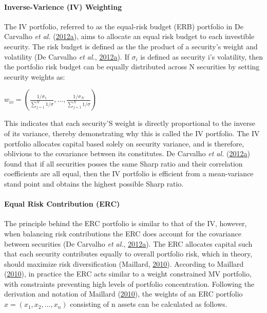 \documentclass[11pt,preprint, authoryear]{elsarticle}
\numberwithin{equation}{section}
\numberwithin{figure}{section}
\numberwithin{table}{section}
\begin{document}
\hypertarget{inverse-varience-iv-weighting}{%
\paragraph{Inverse-Varience (IV)
Weighting}\label{inverse-varience-iv-weighting}}

The IV portfolio, referred to as the equal-risk budget (ERB) portfolio
in De Carvalho \emph{et al.}
(\protect\hyperlink{ref-leote}{2012}\protect\hyperlink{ref-leote}{a}),
aims to allocate an equal risk budget to each investible security. The
risk budget is defined as the the product of a security's weight and
volatility (De Carvalho \emph{et al.},
\protect\hyperlink{ref-leote}{2012}\protect\hyperlink{ref-leote}{a}). If
\(\sigma_i\) is defined as security i's volatility, then the portfolio
risk budget can be equally distributed across N securities by setting
security weights as:

\begin{center} 
$w_{iv}=(\frac{1/\sigma_1}{\sum^N_{j=1} 1/\sigma}, ...,\frac{1/\sigma_N}{\sum^N_{j=1} 1/\sigma} )$ 
\end{center}

This indicates that each security'S weight is directly proportional to
the inverse of its variance, thereby demonstrating why this is called
the IV portfolio. The IV portfolio allocates capital based solely on
security variance, and is therefore, oblivious to the covariance between
its constitutes. De Carvalho \emph{et al.}
(\protect\hyperlink{ref-leote}{2012}\protect\hyperlink{ref-leote}{a})
found that if all securities posses the same Sharp ratio and their
correlation coefficients are all equal, then the IV portfolio is
efficient from a mean-variance stand point and obtains the highest
possible Sharp ratio.

\hypertarget{equal-risk-contribution-erc}{%
\paragraph{Equal Risk Contribution
(ERC)}\label{equal-risk-contribution-erc}}

The principle behind the ERC portfolio is similar to that of the IV,
however, when balancing risk contributions the ERC does account for the
covariance between securities (De Carvalho \emph{et al.},
\protect\hyperlink{ref-leote}{2012}\protect\hyperlink{ref-leote}{a}).
The ERC allocates capital such that each security contributes equally to
overall portfolio risk, which in theory, should maximize risk
diversification (Maillard, \protect\hyperlink{ref-maillard2010}{2010}).
According to Maillard (\protect\hyperlink{ref-maillard2010}{2010}), in
practice the ERC acts similar to a weight constrained MV portfolio, with
constraints preventing high levels of portfolio concentration. Following
the derivation and notation of Maillard
(\protect\hyperlink{ref-maillard2010}{2010}), the weights of an ERC
portfolio \(x=(x_1,x_2,...,x_n)\) consisting of n assets can be
calculated as follows.
\end{document}
